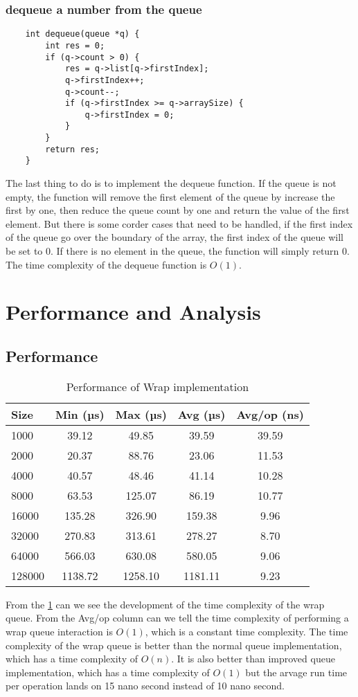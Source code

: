 \subsubsection*{dequeue a number from the queue}
\begin{verbatim}
    int dequeue(queue *q) {
        int res = 0;
        if (q->count > 0) { 
            res = q->list[q->firstIndex];
            q->firstIndex++;
            q->count--;
            if (q->firstIndex >= q->arraySize) {
                q->firstIndex = 0;
            }
        }
        return res;
    }
\end{verbatim}
The last thing to do is to implement the dequeue function. If the queue is not empty, the function will remove the first element of the queue by increase the first by one, then reduce the queue count by one and return the value of the first element. But there is some corder cases that need to be handled, if the first index of the queue go over the boundary of the array, the first index of the queue will be set to 0. If there is no element in the queue, the function will simply return 0. The time complexity of the dequeue function is $O(1)$.


\section*{Performance and Analysis}
\subsection*{Performance}
\begin{table}[h]
    \centering
    \begin{tabular}{|l|c|c|c|c|}
    \hline
    \textbf{Size} & \textbf{Min (µs)} & \textbf{Max (µs)} & \textbf{Avg (µs)} & \textbf{Avg/op (ns)} \\
    \hline
    1000 & 39.12 & 49.85 & 39.59 & 39.59 \\
    2000 & 20.37 & 88.76 & 23.06 & 11.53 \\
    4000 & 40.57 & 48.46 & 41.14 & 10.28 \\
    8000 & 63.53 & 125.07 & 86.19 & 10.77 \\
    16000 & 135.28 & 326.90 & 159.38 & 9.96 \\
    32000 & 270.83 & 313.61 & 278.27 & 8.70 \\
    64000 & 566.03 & 630.08 & 580.05 & 9.06 \\
    128000 & 1138.72 & 1258.10 & 1181.11 & 9.23 \\
    \hline
    \end{tabular}
    \caption{Performance of Wrap implementation}
    \label{tab:wrap_perf}
\end{table}
From the \ref{tab:wrap_perf} can we see the development of the time complexity of the wrap queue. From the Avg/op column can we tell the time complexity of performing a wrap queue interaction is $O(1)$, which is a constant time complexity. The time complexity of the wrap queue is better than the normal queue implementation, which has a time complexity of $O(n)$. It is also better than improved queue implementation, which has a time complexity of $O(1)$ but the arvage run time per operation lands on 15 nano second instead of 10 nano second.


